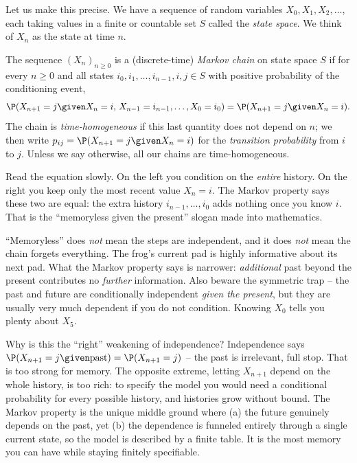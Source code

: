 Let us make this precise. We have a sequence of random variables $X_0, X_1, X_2, \dots$,
each taking values in a finite or countable set $S$ called the \emph{state space}. We think
of $X_n$ as the state at time $n$.

\begin{definition}
\label{ch23:def-markov}
The sequence $(X_n)_{n \ge 0}$ is a (discrete-time) \emph{Markov chain} on state space $S$
if for every $n \ge 0$ and all states $i_0, i_1, \dots, i_{n-1}, i, j \in S$ with positive
probability of the conditioning event,
\[
  \P(X_{n+1} = j \given X_n = i,\, X_{n-1} = i_{n-1}, \dots, X_0 = i_0)
   = \P(X_{n+1} = j \given X_n = i).
\]
The chain is \emph{time-homogeneous} if this last quantity does not depend on $n$; we then
write $p_{ij} = \P(X_{n+1} = j \given X_n = i)$ for the \emph{transition probability} from
$i$ to $j$. Unless we say otherwise, all our chains are time-homogeneous.
\end{definition}

Read the equation slowly. On the left you condition on the \emph{entire} history. On the
right you keep only the most recent value $X_n = i$. The Markov property says these two are
equal: the extra history $i_{n-1}, \dots, i_0$ adds nothing once you know $i$. That is the
``memoryless given the present'' slogan made into mathematics.

\begin{trapbox}
``Memoryless'' does \emph{not} mean the steps are independent, and it does \emph{not} mean
the chain forgets everything. The frog's current pad is highly informative about its next
pad. What the Markov property says is narrower: \emph{additional} past beyond the present
contributes no \emph{further} information. Also beware the symmetric trap -- the past and
future are conditionally independent \emph{given the present}, but they are usually very much
dependent if you do not condition. Knowing $X_0$ tells you plenty about $X_5$.
\end{trapbox}

\begin{whybox}
Why is this the ``right'' weakening of independence? Independence says
$\P(X_{n+1}=j \given \text{past}) = \P(X_{n+1}=j)$ -- the past is irrelevant, full stop.
That is too strong for memory. The opposite extreme, letting $X_{n+1}$ depend on the whole
history, is too rich: to specify the model you would need a conditional probability for every
possible history, and histories grow without bound. The Markov property is the unique
middle ground where (a) the future genuinely depends on the past, yet (b) the dependence is
funneled entirely through a single current state, so the model is described by a finite
table. It is the most memory you can have while staying finitely specifiable.
\end{whybox}

